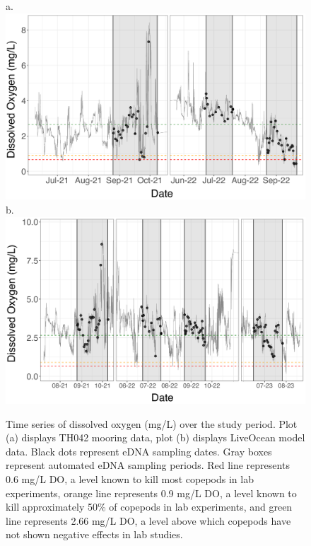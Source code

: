 \documentclass[12pt,twoside]{reedthesis}
\begin{document}
	\begin{figure}[!h]
		\begin{center}
			a. \includegraphics[scale=0.6]{Timeseries_example} \\
			b. \includegraphics[scale=0.6]{Timeseries_example_Mod}
			\caption[Time series]{Time series of dissolved oxygen (mg/L) over the study period. Plot (a) displays TH042 mooring data, plot (b) displays LiveOcean model data. Black dots represent eDNA sampling dates. Gray boxes represent automated eDNA sampling periods. Red line represents 0.6 mg/L DO, a level known to kill most copepods in lab experiments, orange line represents 0.9 mg/L DO, a level known to kill approximately 50\% of copepods in lab experiments, and green line represents 2.66 mg/L DO, a level above which copepods have not shown negative effects in lab studies.} %
		\end{center}
		\label{Timeseries}
	\end{figure} 
	
\end{document}
